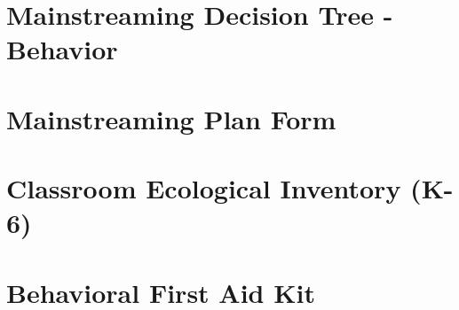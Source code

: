 \documentclass[twoside]{article}
\begin{document}
\section{Mainstreaming Decision Tree - Behavior}
\section{Mainstreaming Plan Form}
\section{Classroom Ecological Inventory (K-6)}
\section{Behavioral First Aid Kit}
\label{Appendix1}

\label{Appendix2}

\label{Appendix3}

\clearpage \mbox{} \clearpage
\label{Appendix4}

\clearpage \mbox{} \clearpage
\label{Appendix5}

%
\end{document}

